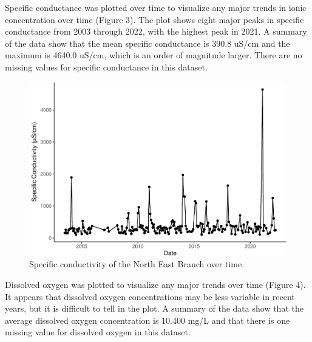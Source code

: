 \documentclass[
  12pt,
]{article}
\begin{document}
\newpage

Specific conductance was plotted over time to visualize any major trends
in ionic concentration over time (Figure 3). The plot shows eight major
peaks in specific conductance from 2003 through 2022, with the highest
peak in 2021. A summary of the data show that the mean specific
conductance is 390.8 uS/cm and the maximum is 4640.0 uS/cm, which is an
order of magnitude larger. There are no missing values for specific
conductance in this dataset.

\begin{figure}

\includegraphics{Fischer_WDA_FinalProject_files/figure-latex/Specific conductivity over time-1} \hfill{}

\caption{Specific conductivity of the North East Branch over time.}\label{fig:Specific conductivity over time}
\end{figure}

\newpage

Dissolved oxygen was plotted to visualize any major trends over time
(Figure 4). It appears that dissolved oxygen concentrations may be less
variable in recent years, but it is difficult to tell in the plot. A
summary of the data show that the average dissolved oxygen concentration
is 10.400 mg/L and that there is one missing value for dissolved oxygen
in this dataset.
\end{document}
